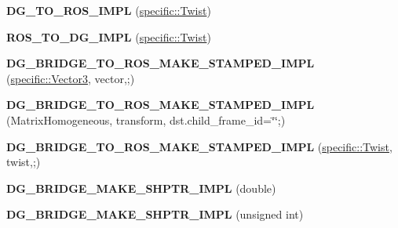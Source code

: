 \begin{DoxyCompactItemize}
\item 
{\bfseries D\+G\+\_\+\+T\+O\+\_\+\+R\+O\+S\+\_\+\+I\+M\+PL} (\hyperlink{classdynamic__graph_1_1specific_1_1Twist}{specific\+::\+Twist})\hypertarget{namespacedynamic__graph_a31a9095c3881b6bee15e84197900b8cd}{}\label{namespacedynamic__graph_a31a9095c3881b6bee15e84197900b8cd}

\item 
{\bfseries R\+O\+S\+\_\+\+T\+O\+\_\+\+D\+G\+\_\+\+I\+M\+PL} (\hyperlink{classdynamic__graph_1_1specific_1_1Twist}{specific\+::\+Twist})\hypertarget{namespacedynamic__graph_ada45ff2abeb0b52a629bd8ece8a27886}{}\label{namespacedynamic__graph_ada45ff2abeb0b52a629bd8ece8a27886}

\item 
{\bfseries D\+G\+\_\+\+B\+R\+I\+D\+G\+E\+\_\+\+T\+O\+\_\+\+R\+O\+S\+\_\+\+M\+A\+K\+E\+\_\+\+S\+T\+A\+M\+P\+E\+D\+\_\+\+I\+M\+PL} (\hyperlink{classdynamic__graph_1_1specific_1_1Vector3}{specific\+::\+Vector3}, vector,;)\hypertarget{namespacedynamic__graph_a9ea269ba67038abab862daa1fb395703}{}\label{namespacedynamic__graph_a9ea269ba67038abab862daa1fb395703}

\item 
{\bfseries D\+G\+\_\+\+B\+R\+I\+D\+G\+E\+\_\+\+T\+O\+\_\+\+R\+O\+S\+\_\+\+M\+A\+K\+E\+\_\+\+S\+T\+A\+M\+P\+E\+D\+\_\+\+I\+M\+PL} (Matrix\+Homogeneous, transform, dst.\+child\+\_\+frame\+\_\+id=\char`\"{}\char`\"{};)\hypertarget{namespacedynamic__graph_a612d5b355619bf2e6aaa3be10d400882}{}\label{namespacedynamic__graph_a612d5b355619bf2e6aaa3be10d400882}

\item 
{\bfseries D\+G\+\_\+\+B\+R\+I\+D\+G\+E\+\_\+\+T\+O\+\_\+\+R\+O\+S\+\_\+\+M\+A\+K\+E\+\_\+\+S\+T\+A\+M\+P\+E\+D\+\_\+\+I\+M\+PL} (\hyperlink{classdynamic__graph_1_1specific_1_1Twist}{specific\+::\+Twist}, twist,;)\hypertarget{namespacedynamic__graph_a9d5a83519738ca735c3c2b33ffe4b8fa}{}\label{namespacedynamic__graph_a9d5a83519738ca735c3c2b33ffe4b8fa}

\item 
{\bfseries D\+G\+\_\+\+B\+R\+I\+D\+G\+E\+\_\+\+M\+A\+K\+E\+\_\+\+S\+H\+P\+T\+R\+\_\+\+I\+M\+PL} (double)\hypertarget{namespacedynamic__graph_ae22a330aece4dccbed6a8e24ac897223}{}\label{namespacedynamic__graph_ae22a330aece4dccbed6a8e24ac897223}

\item 
{\bfseries D\+G\+\_\+\+B\+R\+I\+D\+G\+E\+\_\+\+M\+A\+K\+E\+\_\+\+S\+H\+P\+T\+R\+\_\+\+I\+M\+PL} (unsigned int)\hypertarget{namespacedynamic__graph_a6f98ec6c1978860a339800f794b86c6a}{}\label{namespacedynamic__graph_a6f98ec6c1978860a339800f794b86c6a}


\end{DoxyCompactItemize}
